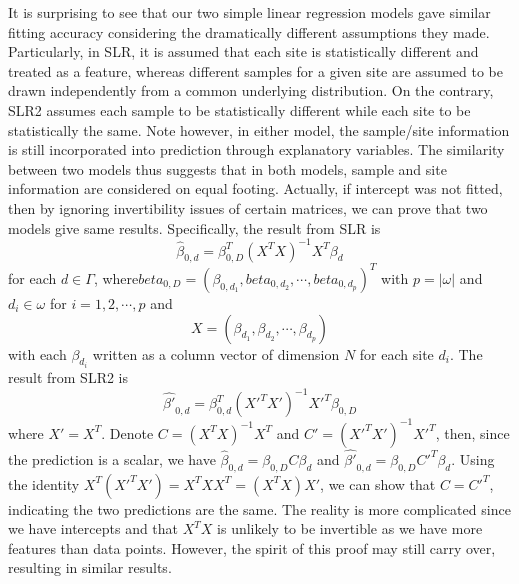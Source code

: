 \documentclass{article} %
\begin{document}
It is surprising to see that our two simple linear regression models gave similar fitting accuracy considering the dramatically different assumptions they made. Particularly, in SLR, it is assumed that each site is statistically different and treated as a feature, whereas different samples for a given site are assumed to be drawn independently from a common underlying distribution. On the contrary, SLR2 assumes each sample to be statistically different while each site to be statistically the same. Note however, in either model, the sample/site information is still incorporated into prediction through explanatory variables. The similarity between two models thus suggests that in both models, sample and site information are considered on equal footing. Actually, if intercept was not fitted, then by ignoring invertibility issues of certain matrices, we can prove that two models give same results. Specifically, the result from SLR is
\begin{displaymath}
\hat{\beta}_{0,d} = \beta_{0,D}^T\left(X^TX\right)^{-1}X^T\beta_d 
\end{displaymath} 
for each $d\in\Gamma$, where$beta_{0,D} = \left(\beta_{0,d_1}, beta_{0,d_2}, \cdots, beta_{0,d_p}\right)^T$ with $p=|\omega|$ and $d_i\in\omega$ for $i=1,2,\cdots,p$ and 
\begin{displaymath}
X = \left( \beta_{d_1}, \beta_{d_2}, \cdots, \beta_{d_p} \right)
\end{displaymath}
with each $\beta_{d_i}$ written as a column vector of dimension $N$ for each site $d_i$. The result from SLR2 is
\begin{displaymath}
\hat{\beta'}_{0,d} = \beta_{0,d}^T\left(X'^TX'\right)^{-1}X'^T\beta_{0,D} 
\end{displaymath} 
where $X' = X^T$. Denote $C=\left(X^TX\right)^{-1}X^T$ and $C' = \left(X'^TX'\right)^{-1}X'^T$, then, since the prediction is a scalar, we have $\hat{\beta}_{0,d} = \beta_{0,D}C\beta_d$ and $\hat{\beta'}_{0,d} = \beta_{0,D}C'^T\beta_d$. Using the identity $X^T\left(X'^TX'\right)=X^TXX^T=\left(X^TX\right)X'$, we can show that $C=C'^T$, indicating the two predictions are the same. The reality is more complicated since we have intercepts and that $X^TX$ is unlikely to be invertible as we have more features than data points. However, the spirit of this proof may still carry over, resulting in similar results.
  
\end{document}

